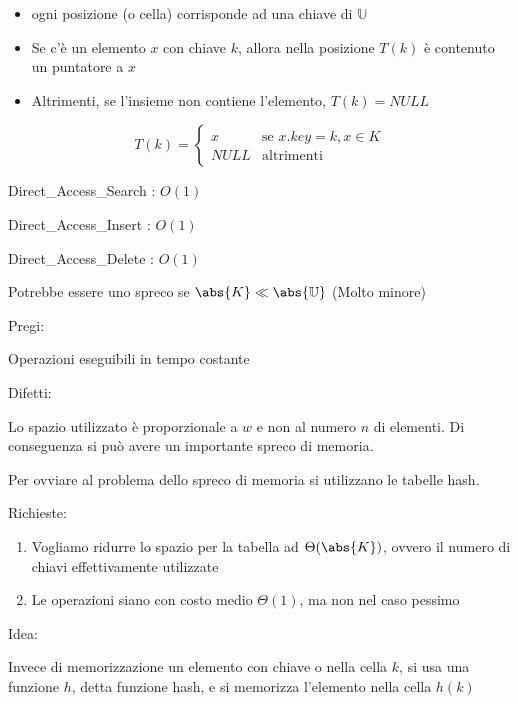 \documentclass[tikz]{article}
\providecommand{\tightlist}{%
  \setlength{\itemsep}{0pt}\setlength{\parskip}{0pt}}
\begin{document}
\begin{itemize}
\tightlist
\item
  {ogni posizione (o cella) corrisponde ad una chiave di $\mathbb{U}$}
\item
  {Se c'è un elemento $x$ con chiave $k$, allora nella posizione $T(k)$ è contenuto un puntatore a $x$}
\item
  {Altrimenti, se l'insieme non contiene l'elemento, $T(k) = NULL$}
\end{itemize}

\begin{equation}
T(k) = 
\begin{cases}
x & \mbox{se } x.key=k, x\in K \\ 
NULL & \mbox{altrimenti} 
\end{cases}
\end{equation}

{Direct\_Access\_Search : }$O(1)$



{Direct\_Access\_Insert : $O(1)$}



{Direct\_Access\_Delete : $O(1)$}



{Potrebbe essere uno spreco se $\abs{K} \ll \abs{\mathbb{U}}$ (Molto minore)}

{Pregi:}

{Operazioni eseguibili in tempo costante}

{Difetti:}

{Lo spazio utilizzato è proporzionale a $w$ e non al numero $n$ di elementi. Di conseguenza si può avere un importante spreco di memoria.}

{Per ovviare al problema dello spreco di memoria si utilizzano le tabelle hash.}

{Richieste:}

\begin{enumerate}
\tightlist
\item
  {Vogliamo ridurre lo spazio per la tabella ad $\Theta(\abs{K})$, ovvero il numero di chiavi
  effettivamente utilizzate}
\item
  {Le operazioni siano con costo medio $\Theta(1)$, ma non nel caso pessimo}
\end{enumerate}

{Idea:}

{Invece di memorizzazione un elemento con chiave o nella cella $k$, si usa una funzione $h$, detta funzione hash, e si memorizza l'elemento nella cella $h(k)$}
\end{document}
